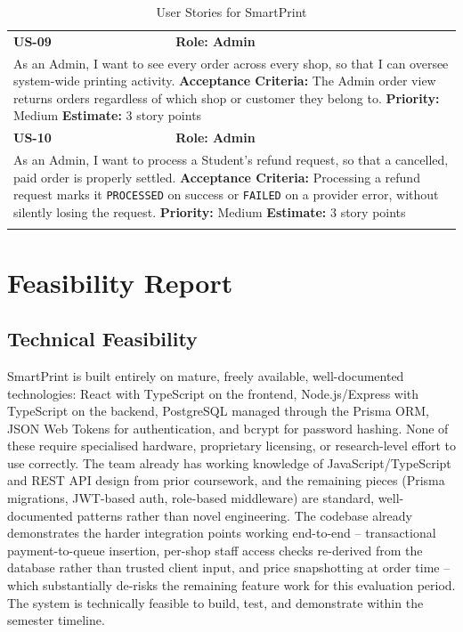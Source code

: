 \documentclass[12pt,a4paper]{report}
\begin{document}
\begin{center}
\begin{longtable}{|p{1.6cm}|p{11.7cm}|}
\textbf{US-09} & \textbf{Role: Admin} \\
\multicolumn{2}{|p{13.3cm}|}{As an Admin, I want to see every order across every shop, so that I can oversee system-wide printing activity. \newline \textbf{Acceptance Criteria:} The Admin order view returns orders regardless of which shop or customer they belong to. \newline \textbf{Priority:} Medium \quad \textbf{Estimate:} 3 story points} \\ \hline

\textbf{US-10} & \textbf{Role: Admin} \\
\multicolumn{2}{|p{13.3cm}|}{As an Admin, I want to process a Student's refund request, so that a cancelled, paid order is properly settled. \newline \textbf{Acceptance Criteria:} Processing a refund request marks it \texttt{PROCESSED} on success or \texttt{FAILED} on a provider error, without silently losing the request. \newline \textbf{Priority:} Medium \quad \textbf{Estimate:} 3 story points} \\ \hline
\caption{User Stories for SmartPrint}
\end{longtable}
\end{center}

\chapter{Feasibility Report}

\section{Technical Feasibility}
SmartPrint is built entirely on mature, freely available, well-documented technologies: React with TypeScript on the frontend, Node.js/Express with TypeScript on the backend, PostgreSQL managed through the Prisma ORM, JSON Web Tokens for authentication, and bcrypt for password hashing. None of these require specialised hardware, proprietary licensing, or research-level effort to use correctly. The team already has working knowledge of JavaScript/TypeScript and REST API design from prior coursework, and the remaining pieces (Prisma migrations, JWT-based auth, role-based middleware) are standard, well-documented patterns rather than novel engineering. The codebase already demonstrates the harder integration points working end-to-end -- transactional payment-to-queue insertion, per-shop staff access checks re-derived from the database rather than trusted client input, and price snapshotting at order time -- which substantially de-risks the remaining feature work for this evaluation period. The system is technically feasible to build, test, and demonstrate within the semester timeline.
\end{document}
